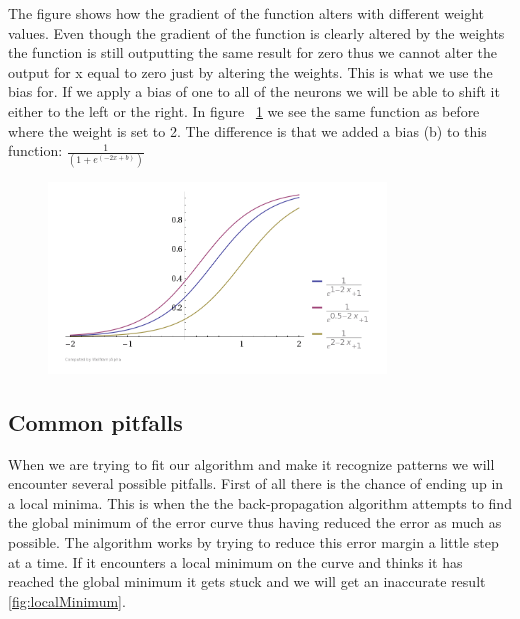 The figure shows how the gradient of the function alters with different weight values. Even though the gradient of the function is clearly altered by the weights the function is still outputting the same result for zero thus we cannot alter the output for x equal to zero just by altering the weights. This is what we use the bias for. If we apply a bias of one to all of the neurons we will be able to shift it either to the left or the right. In figure ~\ref{fig:activationFunctionsWithBias} we see the same function as before where the weight is set to 2. The difference is that we added a bias (b) to this function: \begin{math} \frac{1}{(1+e^{(-2x+b)})} \end{math} \cite[p. 165]{rojas1996neural,inductiveBias}

\begin{figure}[!ht]
\centering
\includegraphics[width=0.8\textwidth ,natwidth=410,natheight=237]{billeder/ActivationFunctionsWithBias.png}
\caption{}
\label{fig:activationFunctionsWithBias}
\end{figure}

\subsection{Common pitfalls}
When we are trying to fit our algorithm and make it recognize patterns we will encounter several possible pitfalls. First of all there is the chance of ending up in a local minima. This is when the the back-propagation algorithm attempts to find the global minimum of the error curve thus having reduced the error as much as possible. The algorithm works by trying to reduce this error margin a little step at a time. If it encounters a local minimum on the curve and thinks it has reached the global minimum it gets stuck and we will get an inaccurate result \ref{fig:localMinimum}. 

